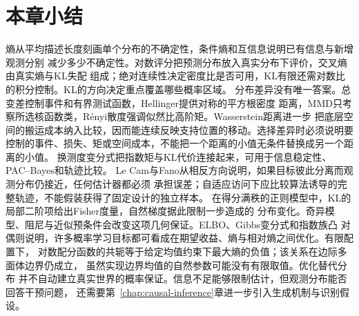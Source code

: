 \section{本章小结}
\label{sec:information-theory-statistical-geometry-summary}
熵从平均描述长度刻画单个分布的不确定性，条件熵和互信息说明已有信息与新增观测分别
减少多少不确定性。对数评分把预测分布放入真实分布下评价，交叉熵由真实熵与KL失配
组成；绝对连续性决定密度比是否可用，KL有限还需对数比的积分控制。KL的方向决定重点覆盖哪些概率区域。
分布差异没有唯一答案。总变差控制事件和有界测试函数，Hellinger提供对称的平方根密度
距离，MMD只考察所选核函数类，R\'enyi散度强调似然比高阶矩。Wasserstein距离进一步
把底层空间的搬运成本纳入比较，因而能连续反映支持位置的移动。选择差异时必须说明要
控制的事件、损失、矩或空间成本，不能把一个距离的小值无条件替换成另一个距离的小值。
换测度变分式把指数矩与KL代价连接起来，可用于信息稳定性、PAC--Bayes和轨迹比较。
Le Cam与Fano从相反方向说明，如果目标彼此分离而观测分布仍接近，任何估计器都必须
承担误差；自适应访问下应比较算法诱导的完整轨迹，不能假装获得了固定设计的独立样本。
在得分满秩的正则模型中，KL的局部二阶项给出Fisher度量，自然梯度据此限制一步造成的
分布变化。奇异模型、阻尼与近似预条件会改变这项几何保证。ELBO、Gibbs变分式和指数族凸
对偶则说明，许多概率学习目标都可看成在期望收益、熵与相对熵之间优化。有限配置下，
对数配分函数的共轭等于给定均值约束下最大熵的负值；该关系在边际多面体边界仍成立，
虽然实现边界均值的自然参数可能没有有限取值。优化替代分布
并不自动建立真实世界的概率保证。信息不足能够限制估计，但观测分布能否回答干预问题，
还需要第~\ref{chap:causal-inference}章进一步引入生成机制与识别假设。
